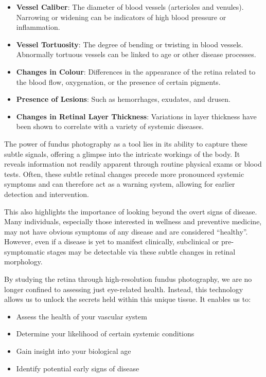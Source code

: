\documentclass[
  Letterpaper,
]{scrbook}
\providecommand{\tightlist}{%
  \setlength{\itemsep}{0pt}\setlength{\parskip}{0pt}}\usepackage{longtable,booktabs,array}
\begin{document}
\begin{itemize}
\tightlist
\item
  \textbf{Vessel Caliber}: The diameter of blood vessels (arterioles and
  venules). Narrowing or widening can be indicators of high blood
  pressure or inflammation.
\item
  \textbf{Vessel Tortuosity}: The degree of bending or twisting in blood
  vessels. Abnormally tortuous vessels can be linked to age or other
  disease processes.
\item
  \textbf{Changes in Colour}: Differences in the appearance of the
  retina related to the blood flow, oxygenation, or the presence of
  certain pigments.
\item
  \textbf{Presence of Lesions}: Such as hemorrhages, exudates, and
  drusen.
\item
  \textbf{Changes in Retinal Layer Thickness}: Variations in layer
  thickness have been shown to correlate with a variety of systemic
  diseases.
\end{itemize}

The power of fundus photography as a tool lies in its ability to capture
these subtle signals, offering a glimpse into the intricate workings of
the body. It reveals information not readily apparent through routine
physical exams or blood tests. Often, these subtle retinal changes
precede more pronounced systemic symptoms and can therefore act as a
warning system, allowing for earlier detection and intervention.

This also highlights the importance of looking beyond the overt signs of
disease. Many individuals, especially those interested in wellness and
preventive medicine, may not have obvious symptoms of any disease and
are considered ``healthy''. However, even if a disease is yet to
manifest clinically, subclinical or pre-symptomatic stages may be
detectable via these subtle changes in retinal morphology.

By studying the retina through high-resolution fundus photography, we
are no longer confined to assessing just eye-related health. Instead,
this technology allows us to unlock the secrets held within this unique
tissue. It enables us to:

\begin{itemize}
\tightlist
\item
  Assess the health of your vascular system
\item
  Determine your likelihood of certain systemic conditions
\item
  Gain insight into your biological age
\item
  Identify potential early signs of disease
\end{itemize}
\end{document}
